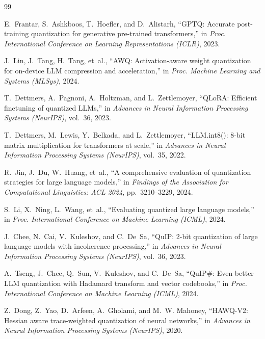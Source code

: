 \documentclass[12pt,a4paper,oneside]{report}
\begin{document}
    \begin{thebibliography}{99}

    E.~Frantar, S.~Ashkboos, T.~Hoefler, and D.~Alistarh,
    ``GPTQ: Accurate post-training quantization for generative pre-trained transformers,''
    in \textit{Proc. International Conference on Learning Representations (ICLR)}, 2023.

    J.~Lin, J.~Tang, H.~Tang, et~al.,
    ``AWQ: Activation-aware weight quantization for on-device LLM compression and acceleration,''
    in \textit{Proc. Machine Learning and Systems (MLSys)}, 2024.

    T.~Dettmers, A.~Pagnoni, A.~Holtzman, and L.~Zettlemoyer,
    ``QLoRA: Efficient finetuning of quantized LLMs,''
    in \textit{Advances in Neural Information Processing Systems (NeurIPS)}, vol.~36, 2023.

    T.~Dettmers, M.~Lewis, Y.~Belkada, and L.~Zettlemoyer,
    ``LLM.int8(): 8-bit matrix multiplication for transformers at scale,''
    in \textit{Advances in Neural Information Processing Systems (NeurIPS)}, vol.~35, 2022.

    R.~Jin, J.~Du, W.~Huang, et~al.,
    ``A comprehensive evaluation of quantization strategies for large language models,''
    in \textit{Findings of the Association for Computational Linguistics: ACL 2024}, pp.~3210--3229, 2024.

    S.~Li, X.~Ning, L.~Wang, et~al.,
    ``Evaluating quantized large language models,''
    in \textit{Proc. International Conference on Machine Learning (ICML)}, 2024.

    J.~Chee, N.~Cai, V.~Kuleshov, and C.~De~Sa,
    ``QuIP: 2-bit quantization of large language models with incoherence processing,''
    in \textit{Advances in Neural Information Processing Systems (NeurIPS)}, vol.~36, 2023.

    A.~Tseng, J.~Chee, Q.~Sun, V.~Kuleshov, and C.~De~Sa,
    ``QuIP\#: Even better LLM quantization with Hadamard transform and vector codebooks,''
    in \textit{Proc. International Conference on Machine Learning (ICML)}, 2024.

    Z.~Dong, Z.~Yao, D.~Arfeen, A.~Gholami, and M.~W. Mahoney,
    ``HAWQ-V2: Hessian aware trace-weighted quantization of neural networks,''
    in \textit{Advances in Neural Information Processing Systems (NeurIPS)}, 2020.


\end{thebibliography}
\end{document}
